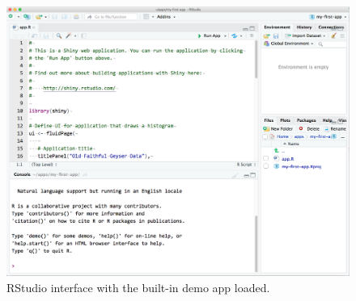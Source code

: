 \documentclass[
  oneside]{book}
\begin{document}
\begin{figure}

{\centering \includegraphics[width=1\linewidth]{images/demo_app/04-rstudio-interface} 

}

\caption{RStudio interface with the built-in demo app loaded.}\label{fig:first-rstudio-interface}
\end{figure}
\end{document}
